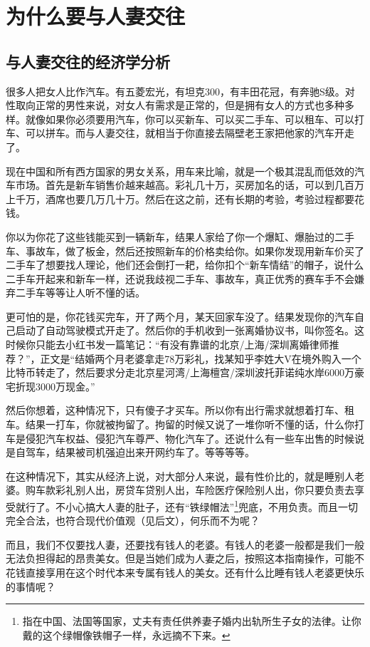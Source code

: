 \chapter{为什么要与人妻交往}

\section{与人妻交往的经济学分析}

很多人把女人比作汽车。有五菱宏光，有坦克300，有丰田花冠，有奔驰S级。对性取向正常的男性来说，对女人有需求是正常的，但是拥有女人的方式也多种多样。就像如果你必须要用汽车，你可以买新车、可以买二手车、可以租车、可以打车、可以拼车。而与人妻交往，就相当于你直接去隔壁老王家把他家的汽车开走了。

现在中国和所有西方国家的男女关系，用车来比喻，就是一个极其混乱而低效的汽车市场。首先是新车销售价越来越高。彩礼几十万，买房加名的话，可以到几百万上千万，酒席也要几万几十万。然后在这之前，还有长期的考验，考验过程都要花钱。

你以为你花了这些钱能买到一辆新车，结果人家给了你一个爆缸、爆胎过的二手车、事故车，做了板金，然后还按照新车的价格卖给你。如果你发现用新车价买了二手车了想要找人理论，他们还会倒打一耙，给你扣个``新车情结''的帽子，说什么二手车开起来和新车一样，还说我歧视二手车、事故车，真正优秀的赛车手不会嫌弃二手车等等让人听不懂的话。

更可怕的是，你花钱买完车，开了两个月，某天回家车没了。结果发现你的汽车自己启动了自动驾驶模式开走了。然后你的手机收到一张离婚协议书，叫你签名。这时候你只能去小红书发一篇笔记：``有没有靠谱的北京/上海/深圳离婚律师推荐？''，正文是``结婚两个月老婆拿走78万彩礼，找某知乎李姓大V在境外购入一个比特币转走了，然后要求分走北京星河湾/上海檀宫/深圳波托菲诺纯水岸6000万豪宅折现3000万现金。''

然后你想着，这种情况下，只有傻子才买车。所以你有出行需求就想着打车、租车。结果一打车，你就被拘留了。拘留的时候又说了一堆你听不懂的话，什么你打车是侵犯汽车权益、侵犯汽车尊严、物化汽车了。还说什么有一些车出售的时候说是自驾车，结果被司机强迫出来开网约车了。等等等等。

在这种情况下，其实从经济上说，对大部分人来说，最有性价比的，就是睡别人老婆。购车款彩礼别人出，房贷车贷别人出，车险医疗保险别人出，你只要负责去享受就行了。不小心搞大人妻的肚子，还有``铁绿帽法''\footnote{指在中国、法国等国家，丈夫有责任供养妻子婚内出轨所生子女的法律。让你戴的这个绿帽像铁帽子一样，永远摘不下来。}兜底，不用负责。而且一切完全合法，也符合现代价值观（见后文），何乐而不为呢？

而且，我们不仅要找人妻，还要找有钱人的老婆。有钱人的老婆一般都是我们一般无法负担得起的昂贵美女。但是当她们成为人妻之后，按照这本指南操作，可能不花钱直接享用在这个时代本来专属有钱人的美女。还有什么比睡有钱人老婆更快乐的事情呢？

